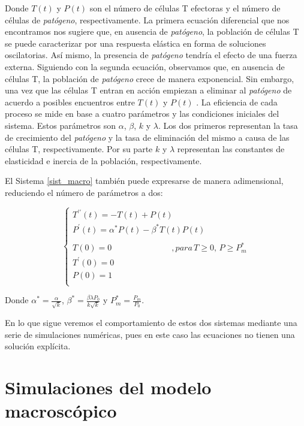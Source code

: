 Donde $T(t)$ y $P(t)$ son el número de células T efectoras y el número de células de \textit{patógeno}, respectivamente. La primera ecuación diferencial que nos encontramos nos sugiere que, en ausencia de \textit{patógeno}, la población de células T se puede caracterizar por una respuesta elástica en forma de soluciones oscilatorias. Así mismo, la presencia de \textit{patógeno} tendría el efecto de una fuerza externa. Siguiendo con la segunda ecuación, observamos que, en ausencia de células T, la población de \textit{patógeno} crece de manera exponencial. Sin embargo, una vez que las células T entran en acción empiezan a eliminar al \textit{patógeno} de acuerdo a posibles encuentros entre $T(t)$ y $P(t)$ \citep{arias2016emergent}. La eficiencia de cada proceso se mide en base a cuatro parámetros y las condiciones iniciales del sistema. Estos parámetros son $\alpha$, $\beta$, $k$ y $\lambda$. Los dos primeros representan la tasa de crecimiento del \textit{patógeno} y la tasa de eliminación del mismo a causa de las células T, respectivamente. Por su parte $k$ y $\lambda$ representan las constantes de elasticidad e inercia de la población, respectivamente.

El Sistema \ref{sist_macro} también puede expresarse de manera adimensional, reduciendo el número de parámetros a dos: 

\begin{equation}
	\label{sist_macro_nod}
	\left\{ \begin{array}{l}
	{T^{\prime\prime}}(t) = -T(t) + P(t) \\
	{P^{\prime}}(t) = \alpha^{*} P(t) - \beta^{*} T(t)P(t) \\
	\\
	T(0)=0 \hspace{3cm} ,para\, T \geq 0,\, P \geq P_m^{*} \\
	T^{\prime}(0)=0  \\
	P(0)=1 \\ 
	\end{array}
	\right.
\end{equation}

Donde $\alpha^{*} = \frac{\alpha}{\sqrt k}$, $\beta^{*} = \frac{\beta \lambda P_0}{k \sqrt k}$ y $P_{m}^{*} = \frac{P_m}{P_0}$.

En lo que sigue veremos el comportamiento de estos dos sistemas mediante una serie de simulaciones numéricas, pues en este caso las ecuaciones no tienen una solución explícita.

\section{Simulaciones del modelo macroscópico}
\label{sec:simu_macro}

